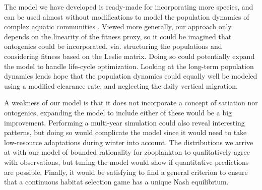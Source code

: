 


The model we have developed is ready-made for incorporating more species, and can be used almost without modifications to model the population dynamics of complex aquatic communities \citep{pinti2019trophic}. Viewed more generally, our approach only depends on the linearity of the fitness proxy, so it could be imagined that ontogenics could be incorporated, via. structuring the populations and considering fitness based on the Leslie matrix. Doing so could potentially expand the model to handle life-cycle optimization. Looking at the long-term population dynamics lends hope that the population dynamics could equally well be modeled using a modified clearance rate, and neglecting the daily vertical migration.


A weakness of our model is that it does not incorporate a concept of satiation nor ontogenics, expanding the model to include either of these would be a big improvement. Performing a multi-year simulation could also reveal interesting patterns, but doing so would complicate the model since it would need to take low-resource adaptations during winter into account. The distributions we arrive at with our model of bounded rationality for zooplankton to qualitatively agree with observations, but tuning the model would show if quantitative predictions are possible. Finally, it would be satisfying to find a general criterion to ensure that a continuous habitat selection game has a unique Nash equilibrium.


